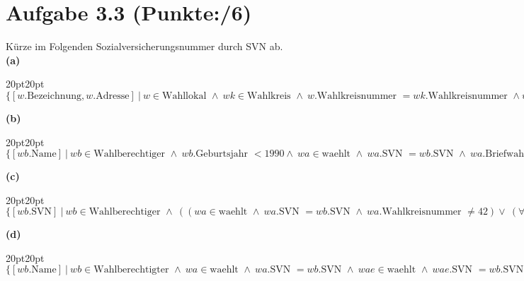 \documentclass[11pt, a4paper]{article}
\newcommand{\blattnummer}{3}
\newcommand{\ppp}{6}
\newcommand{\aufgabe}[2] {\section*{Aufgabe \blattnummer.#1 (Punkte:\qquad/#2)}}
\newcommand{\aufgabenteil}[1] {\textbf{(#1)}}
\begin{document}
\aufgabe{3}{\ppp}
Kürze im Folgenden Sozialversicherungsnummer durch SVN ab.\\
\aufgabenteil{a}
\begin{adjustwidth}{20pt}{20pt}
$\{ [w.\text{Bezeichnung}, w.\text{Adresse}]\ |\ w\in \text{Wahllokal } \wedge \ wk \in \text{Wahlkreis } \wedge\ w.\text{Wahlkreisnummer } = wk.\text{Wahlkreisnummer } \wedge wk.\text{Bezeichnung } =\text{'Aachen II'}\}$
\end{adjustwidth}
\aufgabenteil{b}
\begin{adjustwidth}{20pt}{20pt}
$\{ [wb.\text{Name}]\ |\ wb \in \text{Wahlberechtiger } \wedge\ wb.\text{Geburtsjahr } < 1990 \wedge\ wa \in \text{waehlt } \wedge\ wa.\text{SVN } = wb.\text{SVN } \wedge\ wa.\text{Briefwahl } = \text{'ja'}\}$
\end{adjustwidth}
\aufgabenteil{c}
\begin{adjustwidth}{20pt}{20pt}
$\{ [wb.\text{SVN}]\ |\ wb \in \text{Wahlberechtiger } \wedge\ ((wa \in \text{waehlt } \wedge\ wa.\text{SVN } = wb.\text{SVN } \wedge\ wa.\text{Wahlkreisnummer } \neq 42) \vee\ (\forall wae \in \text{waehlt }(wae.\text{SVN } \neq wb.\text{SVN })))\}$
\end{adjustwidth}
\aufgabenteil{d}
\begin{adjustwidth}{20pt}{20pt}
$\{ [wb.\text{Name}]\ |\ wb \in \text{Wahlberechtigter } \wedge\ wa \in \text{waehlt } \wedge\ wa.\text{SVN } = wb.\text{SVN } \wedge\ wae \in \text{waehlt } \wedge\ wae.\text{SVN } = wb.\text{SVN } \wedge\ wa.\text{Wahllokal } = wae.\text{Wahllokal } \wedge\
    wa.\text{Wahljahr } \neq wae.\text{Wahljahr }\}$
\end{adjustwidth}
\end{document}

